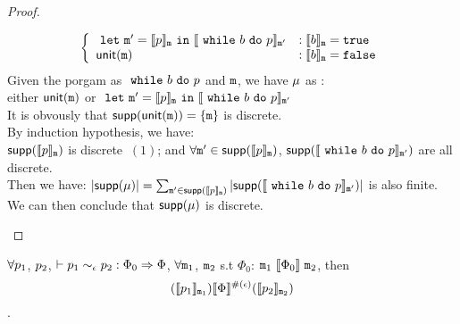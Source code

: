 \documentclass[a4paper,11pt]{article}
\begin{document}
\begin{proof}
\begin{itemize}
	\caseL{
	$\extend{\ewhile \bexpr \edo \prog}$
	}
	\[	
	\left\{
	\begin{array}{ll}
	~\mathtt{let}~ \mathtt{m}' = \llbracket p \rrbracket_{\mathtt{m}} ~\mathtt{in}~ 
	\llbracket ~\mathtt{while}~ b ~\mathtt{do}~ p \rrbracket_{\mathtt{m}'}
	  & : \llbracket b \rrbracket_{\mathtt{m}} = \mathtt{true} \\
	\mathsf{unit}(\mathtt{m}) & : \llbracket b \rrbracket_{\mathtt{m}} = \mathtt{false} \\
	\end{array}
	\right .
	\]
	Given the porgam as $~\mathtt{while}~ b ~\mathtt{do}~ p$ and $\mathtt{m}$, 
	we have $\mu$ as :
	\\
	either $\mathsf{unit}(\mathtt{m})$ or
	$~\mathtt{let}~ \mathtt{m}' = \llbracket p \rrbracket_{\mathtt{m}} ~\mathtt{in}~ 
	\llbracket ~\mathtt{while}~ b ~\mathtt{do}~ p \rrbracket_{\mathtt{m}'}$ 
	 \\
	 It is obvously that $\mathsf{supp}( \mathsf{unit}(\mathtt{m})) = \{\mathtt{m}\}$ is discrete.
	 \\
	 By induction hypothesis, we have:
	 \\
	 $\mathsf{supp}(\llbracket p \rrbracket_{\mathtt{m}})$ is discrete $~(1)$; and 
	 $\forall \mathtt{m}' \in \mathsf{supp}(\llbracket p \rrbracket_{\mathtt{m}})$, $\mathsf{supp}(\llbracket ~\mathtt{while}~ b ~\mathtt{do}~ p \rrbracket_{\mathtt{m}'})$ are all discrete.
	 \\
	 Then we have: $\left \vert \mathsf{supp}(\mu) \right \vert = \sum_{\mathtt{m}' \in \mathsf{supp}(\llbracket p \rrbracket_{\mathtt{m}})} \left \vert \mathsf{supp}(\llbracket ~\mathtt{while}~ b ~\mathtt{do}~ p \rrbracket_{\mathtt{m}'}) \right \vert$ is also finite.
	 \\
	 We can then conclude that $\mathsf{supp}(\mu)$ is discrete.
\end{itemize}
\end{proof}
%
%
%
\clearpage
\begin{thm}[Soundness]
 $\forall p_1$, $p_2$,  $ \vdash p_1	
\sim_{\epsilon} 
p_2 :
\Phi_0 \Rightarrow \Phi $,    $\forall \mathtt{m}_1$, $\mathtt{m}_2$ 
s.t $\Phi_0$: 
$\mathtt{m}_1 ~ \llbracket \Phi_0 \rrbracket ~ \mathtt{m}_2$,
then
$$ 
(\llbracket p_1 \rrbracket_{\mathtt{m}_1})  
\llbracket \Phi \rrbracket^{\#(\epsilon)} 
(\llbracket p_2 \rrbracket_{\mathtt{m}_2}) 
$$.
\end{thm}
%
%
%
\end{document}

